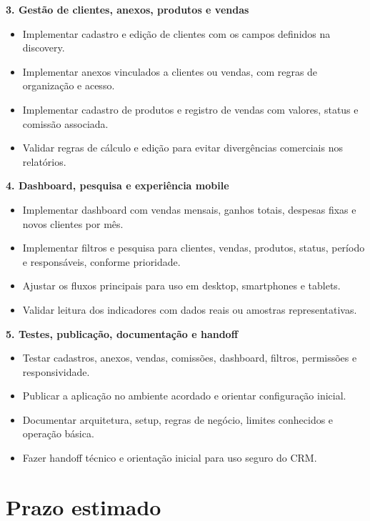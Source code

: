 \documentclass[11pt,a4paper]{article}
\begin{document}
\textbf{3. Gestão de clientes, anexos, produtos e vendas}\par

\begin{itemize}
\item Implementar cadastro e edição de clientes com os campos definidos na discovery.
\item Implementar anexos vinculados a clientes ou vendas, com regras de organização e acesso.
\item Implementar cadastro de produtos e registro de vendas com valores, status e comissão associada.
\item Validar regras de cálculo e edição para evitar divergências comerciais nos relatórios.
\end{itemize}

\textbf{4. Dashboard, pesquisa e experiência mobile}\par

\begin{itemize}
\item Implementar dashboard com vendas mensais, ganhos totais, despesas fixas e novos clientes por mês.
\item Implementar filtros e pesquisa para clientes, vendas, produtos, status, período e responsáveis, conforme prioridade.
\item Ajustar os fluxos principais para uso em desktop, smartphones e tablets.
\item Validar leitura dos indicadores com dados reais ou amostras representativas.
\end{itemize}

\textbf{5. Testes, publicação, documentação e handoff}\par

\begin{itemize}
\item Testar cadastros, anexos, vendas, comissões, dashboard, filtros, permissões e responsividade.
\item Publicar a aplicação no ambiente acordado e orientar configuração inicial.
\item Documentar arquitetura, setup, regras de negócio, limites conhecidos e operação básica.
\item Fazer handoff técnico e orientação inicial para uso seguro do CRM.
\end{itemize}

\section*{Prazo estimado}
\end{document}
